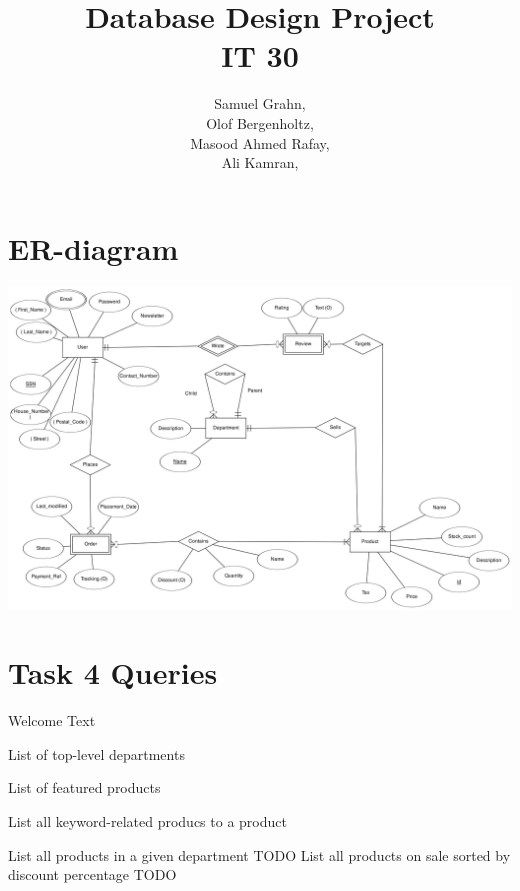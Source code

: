\documentclass{article}
\title{
  Database Design Project\\
  IT 30
}
\author{
  Samuel Grahn, \email{samuel.grahn@outlook.com}\\
  Olof Bergenholtz, \email{obergenholtz@gmail.com}\\
  Masood Ahmed Rafay, \email{Rafayqureshi2010@gmail.com}\\
  Ali Kamran, \email{alkmrn1@gmail.com}\\
}
\newcommand{\sql}[1]{}
\begin{document}
\maketitle
\newpage
\section*{ER-diagram}
\includegraphics[height=\linewidth,angle=90]{er.png}

\section*{Task 4 Queries}
Welcome Text
\sql{welcome}
List of top-level departments
\sql{topleveldpt}
List of featured products
\sql{featured_producs}
List all keyword-related producs to a product
\sql{similar_products}
List all products in a given department
TODO
List all products on sale sorted by discount percentage
TODO
\end{document}
